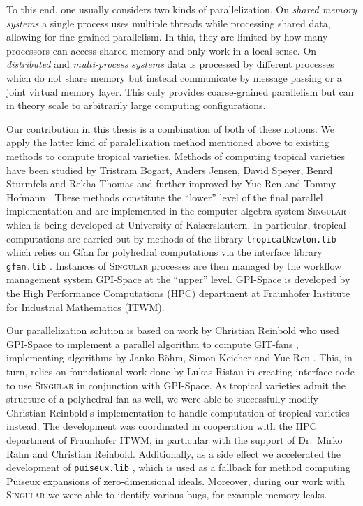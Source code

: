 \documentclass[
  paper=a4,
  titlepage,
  bibliography=totoc,
  pagesize=pdftex
]{scrartcl}
\numberwithin{figure}{section}
\numberwithin{equation}{section}
\numberwithin{table}{section}
\theoremstyle{definition}
\numberwithin{definition}{section}
\begin{document}
To this end, one usually considers two kinds of parallelization. On \emph{shared memory
systems} a single process uses multiple threads while processing shared data, allowing for
fine-grained parallelism. In this, they are limited by how many processors can access
shared memory and only work in a local sense. On \emph{distributed} and
\emph{multi-process systems} data is processed by different processes which do not share
memory but instead communicate by message passing or a joint virtual memory layer. This
only provides coarse-grained parallelism but can in theory scale to arbitrarily large
computing configurations.

Our contribution in this thesis is a combination of both of these notions: We apply the
latter kind of paralellization method mentioned above to existing methods to compute
tropical varieties. Methods of computing tropical varieties have been studied by Tristram
Bogart, Anders Jensen, David Speyer, Benrd Sturmfels and Rekha Thomas \cite{compTropVar}
and further improved by Yue Ren and Tommy Hofmann \cite{tropPointsLinks}. These methods
constitute the \enquote{lower} level of the final parallel implementation and are
implemented in the computer algebra system \textsc{Singular} \cite{Singular} which is
being developed at University of Kaiserslautern. In particular, tropical computations are
carried out by methods of the library \texttt{tropicalNewton.lib} \cite{tropNewtLib} which
relies on Gfan \cite{gfan} for polyhedral computations via the interface library
\texttt{gfan.lib} \cite{gfanLib}. Instances of \textsc{Singular} processes are then
managed by the workflow management system GPI-Space \cite{gpispace} at the \enquote{upper}
level. GPI-Space is developed by the High Performance Computations (HPC) department at
Fraunhofer Institute for Industrial Mathematics (ITWM).

Our parallelization solution is based on work by Christian Reinbold who used GPI-Space to
implement a parallel algorithm to compute GIT-fans \cite{reinboldGitFan}, implementing
algorithms by Janko Böhm, Simon Keicher and Yue Ren \cite{compGitFan}. This, in turn,
relies on foundational work done by Lukas Ristau in creating interface code to use
\textsc{Singular} in conjunction with GPI-Space. As tropical varieties admit the structure
of a polyhedral fan as well, we were able to successfully modify Christian Reinbold's
implementation to handle computation of tropical varieties instead. The development was
coordinated in cooperation with the HPC department of Fraunhofer ITWM, in particular with
the support of Dr.~Mirko Rahn and Christian Reinbold. Additionally, as a side effect we
accelerated the development of \texttt{puiseux.lib} \cite{puiseuxLib}, which is used as a
fallback for method computing Puiseux expansions of zero-dimensional ideals. Moreover,
during our work with \textsc{Singular} we were able to identify various bugs, for example
memory leaks.
\end{document}
